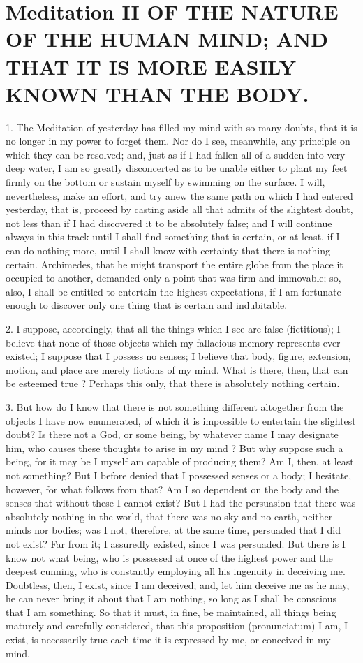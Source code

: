 \section{Meditation II OF THE NATURE OF THE HUMAN MIND; AND THAT IT IS MORE EASILY KNOWN THAN THE BODY.}

1. The Meditation of yesterday has filled my mind with so many doubts, that it is no longer in my power to forget them. Nor do I see, meanwhile, any principle on which they can be resolved; and, just as if I had fallen all of a sudden into very deep water, I am so greatly disconcerted as to be unable either to plant my feet firmly on the bottom or sustain myself by swimming on the surface. I will, nevertheless, make an effort, and try anew the same path on which I had entered yesterday, that is, proceed by casting aside all that admits of the slightest doubt, not less than if I had discovered it to be absolutely false; and I will continue always in this track until I shall find something that is certain, or at least, if I can do nothing more, until I shall know with certainty that there is nothing certain. Archimedes, that he might transport the entire globe from the place it occupied to another, demanded only a point that was firm and immovable; so, also, I shall be entitled to entertain the highest expectations, if I am fortunate enough to discover only one thing that is certain and indubitable.

2. I suppose, accordingly, that all the things which I see are false (fictitious); I believe that none of those objects which my fallacious memory represents ever existed; I suppose that I possess no senses; I believe that body, figure, extension, motion, and place are merely fictions of my mind. What is there, then, that can be esteemed true ? Perhaps this only, that there is absolutely nothing certain.

3. But how do I know that there is not something different altogether from the objects I have now enumerated, of which it is impossible to entertain the slightest doubt? Is there not a God, or some being, by whatever name I may designate him, who causes these thoughts to arise in my mind ? But why suppose such a being, for it may be I myself am capable of producing them? Am I, then, at least not something? But I before denied that I possessed senses or a body; I hesitate, however, for what follows from that? Am I so dependent on the body and the senses that without these I cannot exist? But I had the persuasion that there was absolutely nothing in the world, that there was no sky and no earth, neither minds nor bodies; was I not, therefore, at the same time, persuaded that I did not exist? Far from it; I assuredly existed, since I was persuaded. But there is I know not what being, who is possessed at once of the highest power and the deepest cunning, who is constantly employing all his ingenuity in deceiving me. Doubtless, then, I exist, since I am deceived; and, let him deceive me as he may, he can never bring it about that I am nothing, so long as I shall be conscious that I am something. So that it must, in fine, be maintained, all things being maturely and carefully considered, that this proposition (pronunciatum) I am, I exist, is necessarily true each time it is expressed by me, or conceived in my mind.

